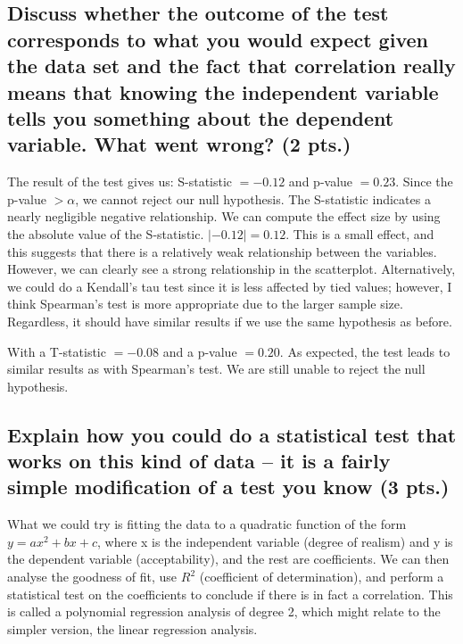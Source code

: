 \documentclass[a4paper]{article}
\begin{document}
\subsection{Discuss whether the outcome of the test corresponds to what you would expect given the data set and the fact that correlation really means that knowing the independent variable tells you something about the dependent variable. What went wrong? (2 pts.)}
The result of the test gives us: S-statistic $= -0.12$ and p-value $= 0.23$. Since the p-value $> \alpha$, we cannot reject our null hypothesis. The S-statistic indicates a nearly negligible negative relationship. We can compute the effect size by using the absolute value of the S-statistic. $|-0.12| = 0.12$. This is a small effect, and this suggests that there is a relatively weak relationship between the variables. However, we can clearly see a strong relationship in the scatterplot.
Alternatively, we could do a Kendall's tau test since it is less affected by tied values; however, I think Spearman's test is more appropriate due to the larger sample size. Regardless, it should have similar results if we use the same hypothesis as before.
With a T-statistic $= -0.08$ and a p-value $= 0.20$. As expected, the test leads to similar results as with Spearman's test. We are still unable to reject the null hypothesis.
\subsection{Explain how you could do a statistical test that works on this kind of data – it is a fairly simple modification of a test you know (3 pts.)}
What we could try is fitting the data to a quadratic function of the form $y= ax^2 + bx + c$, where x is the independent variable (degree of realism) and y is the dependent variable (acceptability), and the rest are coefficients. We can then analyse the goodness of fit, use $R^2$ (coefficient of determination), and perform a statistical test on the coefficients to conclude if there is in fact a correlation. This is called a polynomial regression analysis of degree 2, which might relate to the simpler version, the linear regression analysis.
\end{document}
